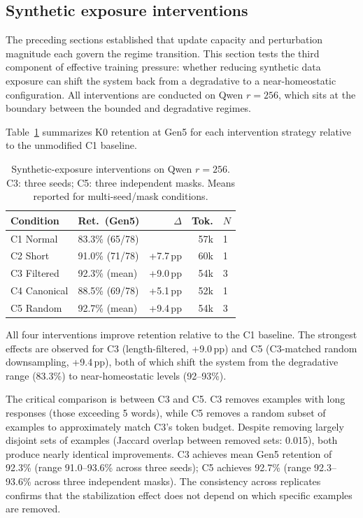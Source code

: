 \documentclass[a4paper,fleqn]{cas-dc}
\begin{document}
\subsection{Synthetic exposure interventions}\label{sec:res_intervention}

The preceding sections established that update capacity and perturbation
magnitude each govern the regime transition. This section tests the third
component of effective training pressure: whether reducing synthetic data
exposure can shift the system back from a degradative to a near-homeostatic
configuration. All interventions are conducted on Qwen $r=256$, which sits at
the boundary between the bounded and degradative regimes.

Table~\ref{tab:interventions} summarizes K0 retention at Gen5 for each
intervention strategy relative to the unmodified C1 baseline.

\begin{table}[width=.95\linewidth,cols=5,pos=htbp]
\caption{Synthetic-exposure interventions on Qwen $r=256$. C3: three seeds;
C5: three independent masks. Means reported for multi-seed/mask
conditions.}\label{tab:interventions}
\begin{tabular*}{\tblwidth}{@{} llrrl@{} }
\toprule
Condition & Ret.\ (Gen5) & $\Delta$ & Tok. & $N$ \\
\midrule
C1 Normal    & 83.3\% (65/78) &          & 57k & 1      \\
C2 Short     & 91.0\% (71/78) & +7.7\,pp & 60k & 1      \\
C3 Filtered  & 92.3\% (mean)  & +9.0\,pp & 54k & 3 \\
C4 Canonical & 88.5\% (69/78) & +5.1\,pp & 52k & 1      \\
C5 Random    & 92.7\% (mean)  & +9.4\,pp & 54k & 3 \\
\bottomrule
\end{tabular*}
\end{table}

All four interventions improve retention relative to the C1 baseline. The
strongest effects are observed for C3 (length-filtered, +9.0\,pp) and C5
(C3-matched random downsampling, +9.4\,pp), both of which shift the system from
the degradative range (83.3\%) to near-homeostatic levels (92--93\%).

The critical comparison is between C3 and C5. C3 removes examples with long
responses (those exceeding 5 words), while C5 removes a random subset of
examples to approximately match C3's token budget. Despite removing largely
disjoint sets of examples (Jaccard overlap between removed sets: 0.015), both
produce nearly identical improvements. C3 achieves mean Gen5 retention of
92.3\% (range 91.0--93.6\% across three seeds); C5 achieves 92.7\% (range
92.3--93.6\% across three independent masks). The consistency across replicates
confirms that the stabilization effect does not depend on which specific
examples are removed.
\end{document}
